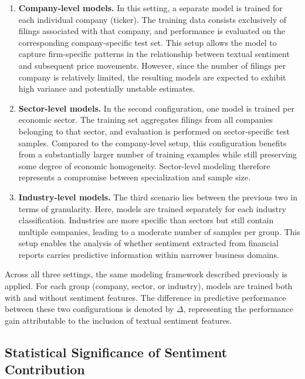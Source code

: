\begin{enumerate}
    \item \textbf{Company-level models.}  
    In this setting, a separate model is trained for each individual company (ticker). The training data consists exclusively of filings associated with that company, and performance is evaluated on the corresponding company-specific test set. This setup allows the model to capture firm-specific patterns in the relationship between textual sentiment and subsequent price movements. However, since the number of filings per company is relatively limited, the resulting models are expected to exhibit high variance and potentially unstable estimates.

    \item \textbf{Sector-level models.}  
    In the second configuration, one model is trained per economic sector. The training set aggregates filings from all companies belonging to that sector, and evaluation is performed on sector-specific test samples. Compared to the company-level setup, this configuration benefits from a substantially larger number of training examples while still preserving some degree of economic homogeneity. Sector-level modeling therefore represents a compromise between specialization and sample size.

    \item \textbf{Industry-level models.}  
    The third scenario lies between the previous two in terms of granularity. Here, models are trained separately for each industry classification. Industries are more specific than sectors but still contain multiple companies, leading to a moderate number of samples per group. This setup enables the analysis of whether sentiment extracted from financial reports carries predictive information within narrower business domains.
\end{enumerate}

Across all three settings, the same modeling framework described previously is applied. For each group (company, sector, or industry), models are trained both with and without sentiment features. 
The difference in predictive performance between these two configurations is denoted by $\Delta$, representing the performance gain attributable to the inclusion of textual sentiment features.

\subsection{Statistical Significance of Sentiment Contribution}

